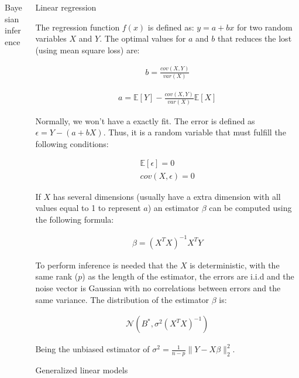\documentclass{beamer}
\begin{document}
\begin{columns}
\begin{column}{0.3\textwidth}
\begin{block}{Bayesian inference}
\end{block}

\end{column}
\begin{column}{0.3\textwidth}

\begin{block}{Linear regression}

The regression function $f(x)$ is defined as: $y = a + bx$ for two random variables $X$ and $Y$. The optimal values for $a$ and $b$ that reduces the lost (using mean square loss) are:

\begin{align*}
    b = \frac{cov(X,Y)}{var(X)}
\end{align*}

\begin{align*}
    a = \mathbb{E}[Y] - \frac{cov(X,Y)}{var(X)}\mathbb{E}[X]
\end{align*}

Normally, we won't have a exactly fit. The error is defined as $\epsilon = Y - (a + bX)$. Thus, it is a random variable that must fulfill the following conditions:

\begin{align*}
   \mathbb{E}[\epsilon]  = 0 \\
   cov(X,\epsilon) = 0
\end{align*}

If $X$ has several dimensions (usually have a extra dimension with all values equal to 1 to represent $a$) an estimator $\beta$ can be computed using the following formula:

\begin{align*}
    \beta = (X^T X)^{-1} X^T Y
\end{align*}

To perform inference is needed that the $X$ is deterministic, with the same rank ($p$) as the length of the estimator, the errors are i.i.d and the noise vector is Gaussian with no correlations between errors and the same variance. The distribution of the estimator $\beta$ is:

\begin{align*}
    \mathcal{N}(B^*, \sigma^2 (X^T X)^{-1})
\end{align*}

Being the unbiased estimator of $\sigma^2 = \frac{1}{n-p} \lVert Y - X\beta \rVert_2^2$.

\end{block}

\begin{block}{Generalized linear models}


\end{block}
\end{column}
\end{columns}
\end{document}
